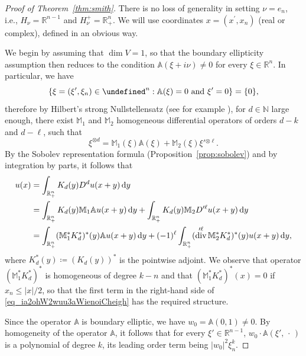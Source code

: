 \documentclass[a4paper,10pt]{amsart}
\let\C\undefined
\newcommand{\R}{\mathbb R}
\newcommand{\N}{\mathbb N}
\renewcommand{\leq}{\leqslant}
\newcommand{\dif}{\mathrm{d}}
\DeclareMathOperator{\diver}{div}
\renewcommand{\dif}{\operatorname{d}\!}
\newcommand{\A}{\mathbb{A}}
\newcommand{\C}{\mathbb{C}}
\numberwithin{equation}{section}
\theoremstyle{remark}
\numberwithin{equation}{section}
\begin{document}
	
	\begin{proof}[Proof of Theorem~\ref{thm:smith}]
		There is no loss of generality in setting $\nu=e_n$, i.e., $H_\nu=\R^{n-1}$ and $H^+_\nu=\R^n_+$. We will use coordinates $x=(x^\prime,x_n)$ (real or complex), defined in an obvious way. 
		
		We begin by assuming that \(\dim V = 1\), so that the boundary ellipticity assumption then reduces to 
		the condition \(\A (\xi + i \nu) \ne 0\) for every \(\xi \in \R^{n}\).
		In particular, we have 
		\[
		\{ \xi = (\xi', \xi_n) \in \C^n : \A (\xi) = 0 \text{ and } \xi' = 0 \}
		= \{0\},
		\]
		therefore by Hilbert's strong Nullstellensatz (see for example \cite[Chpt.\ 4, \S 2, Thm. 6]{CLO}), for \(d \in \N\) large enough, there exist \(\mathbb{M}_1\) and \(\mathbb{M}_2\) homogeneous differential operators of orders \(d - k\) and \(d - \ell\), such that 
		\[
		\xi^{\otimes d} = \mathbb{M}_1 (\xi) \A (\xi) + \mathbb{M}_2(\xi) \xi'{}^{\otimes\ell}.
		\]
		By the Sobolev representation formula (Proposition~\ref{prop:sobolev}) and by integration by parts, it follows that 
		\begin{align}
			u(x) & = \int_{\R^n_+} K_d (y) D^d u (x + y) \dif y \notag \\
			&=  \int_{\R^n_+} K_d (y) \mathbb{M}_1 \mathbb{A} u (x + y) \dif y
			+ \int_{\R^n_+} K_d (y) \mathbb{M}_2 D'^{\ell} u (x + y) \dif y\label{eq_ia2ohW2wuu3aWienoiCheigh} \\
			& = \int_{\R^n_+}  (\mathbb{M}_1^* K_d^*)^* (y) \mathbb{A} u (x + y) \dif y
			+(-1)^{\ell}\int_{\R^n_+}  (\diver'^{\ell} \mathbb{M}_2^* K_d^*)^* (y) u (x + y) \dif y,\notag
		\end{align}
		where \(K_d^* (y) \coloneqq (K_d(y))^*\) is the pointwise adjoint.
		We observe that operator \( (\mathbb{M}_1^* K_d^*)^* \) is homogeneous of degree \(k - n\) and that \((\mathbb{M}_1^* K_d^*)^* (x) = 0\) if \(x_n \leq \vert x\vert/2\), so that the first term in the right-hand side of \eqref{eq_ia2ohW2wuu3aWienoiCheigh} has the required structure.
		
		Since the operator \(\A\) is boundary elliptic, we have \(w_0 = \A (0, 1) \ne 0\).
		By homogeneity of the operator \(\A\), it follows that for every \(\xi' \in \R^{n - 1}\), \(w_0 \cdot \A(\xi',\,\cdot\,)\) is a polynomial of degree \(k\), its leading order term being \(\vert w_0 \vert^2 \xi_n^k\).
		

\end{proof}
\end{document}
